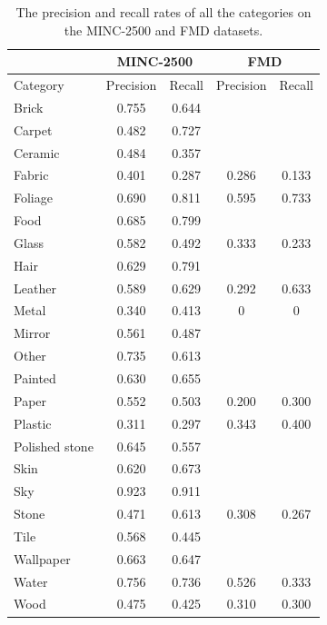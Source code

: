 \documentclass[12pt,a4paper]{article}
\begin{document}
	\begin{table}
		\centering
		\caption{The precision and recall rates of all the categories on the MINC-2500 and FMD datasets.}
		\begin{tabular}{l|c c|c c}
			 	& \multicolumn{2}{c|}{MINC-2500}& \multicolumn{2}{c}{FMD} 	\\ \hline
			Category 		& Precision	& Recall 	& Precision	& Recall	\\ \hline
			Brick			& 0.755		& 0.644		& 			& 		\\ \hline
			Carpet			& 0.482		& 0.727		& 			& 		\\ \hline
			Ceramic			& 0.484		& 0.357		& 			& 		\\ \hline
			Fabric			& 0.401		& 0.287		& 0.286 	& 0.133	\\ \hline
			Foliage			& 0.690		& 0.811		& 0.595 	& 0.733	\\ \hline
			Food			& 0.685		& 0.799		& 			& 		\\ \hline
			Glass			& 0.582		& 0.492		& 0.333 	& 0.233	\\ \hline
			Hair			& 0.629		& 0.791		& 			& 		\\ \hline
			Leather			& 0.589		& 0.629		& 0.292 	& 0.633	\\ \hline
			Metal			& 0.340		& 0.413		& 0 		& 0		\\ \hline
			Mirror			& 0.561		& 0.487		& 			& 		\\ \hline
			Other			& 0.735		& 0.613		& 			& 		\\ \hline
			Painted			& 0.630		& 0.655		& 			& 		\\ \hline
			Paper			& 0.552		& 0.503		& 0.200 	& 0.300	\\ \hline
			Plastic			& 0.311		& 0.297		& 0.343 	& 0.400	\\ \hline
			Polished stone	& 0.645		& 0.557		& 			& 		\\ \hline
			Skin			& 0.620		& 0.673		& 			& 		\\ \hline
			Sky				& 0.923		& 0.911		& 			& 		\\ \hline
			Stone			& 0.471		& 0.613		& 0.308 	& 0.267	\\ \hline
			Tile			& 0.568		& 0.445		& 			& 		\\ \hline
			Wallpaper		& 0.663		& 0.647		& 			& 		\\ \hline
			Water			& 0.756		& 0.736		& 0.526 	& 0.333	\\ \hline
			Wood			& 0.475		& 0.425		& 0.310 	& 0.300	\\ \hline
		\end{tabular}
	\label{table:prec_rec}
	\end{table}
	
\end{document}
